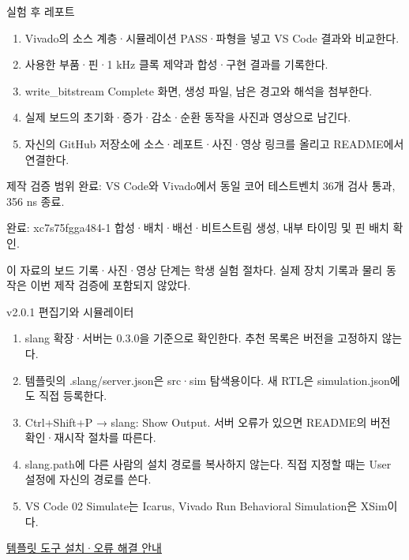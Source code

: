 \begin{frame}[label=after-report]{실험 후 레포트}
\small
\begin{enumerate}
\item Vivado의 소스 계층·시뮬레이션 PASS·파형을 넣고 VS Code 결과와 비교한다.
\item 사용한 부품·핀·1 kHz 클록 제약과 합성·구현 결과를 기록한다.
\item write\_bitstream Complete 화면, 생성 파일, 남은 경고와 해석을 첨부한다.
\item 실제 보드의 초기화·증가·감소·순환 동작을 사진과 영상으로 남긴다.
\item 자신의 GitHub 저장소에 소스·레포트·사진·영상 링크를 올리고 README에서 연결한다.
\end{enumerate}
\end{frame}

\begin{frame}{제작 검증 범위}
\small
완료: VS Code와 Vivado에서 동일 코어 테스트벤치 36개 검사 통과, 356 ns 종료.\par\vspace{0.26cm}완료: xc7s75fgga484-1 합성·배치·배선·비트스트림 생성, 내부 타이밍 및 핀 배치 확인.\par\vspace{0.26cm}이 자료의 보드 기록·사진·영상 단계는 학생 실험 절차다. 실제 장치 기록과 물리 동작은 이번 제작 검증에 포함되지 않았다.\par
\end{frame}
\begin{frame}{v2.0.1 편집기와 시뮬레이터}
\small
\begin{enumerate}
\item slang 확장·서버는 0.3.0을 기준으로 확인한다. 추천 목록은 버전을 고정하지 않는다.
\item 템플릿의 .slang/server.json은 src·sim 탐색용이다. 새 RTL은 simulation.json에도 직접 등록한다.
\item Ctrl+Shift+P → slang: Show Output. 서버 오류가 있으면 README의 버전 확인·재시작 절차를 따른다.
\item slang.path에 다른 사람의 설치 경로를 복사하지 않는다. 직접 지정할 때는 User 설정에 자신의 경로를 쓴다.
\item VS Code 02 Simulate는 Icarus, Vivado Run Behavioral Simulation은 XSim이다.
\end{enumerate}\href{https://github.com/Glaysia/fpga-lab-template/tree/v2.0.1\#3-실행-준비}{템플릿 도구 설치·오류 해결 안내}
\end{frame}

